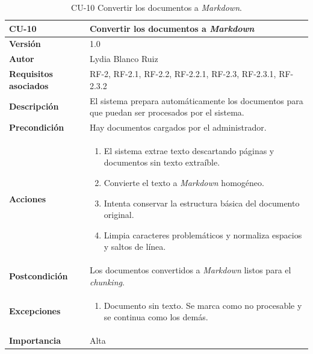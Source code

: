 \begin{table}[p]
	\centering
	\begin{tabularx}{\linewidth}{ p{} p{} }
		\toprule
		\textbf{CU-10}    & \textbf{Convertir los documentos a \textit{Markdown}}\\
		\toprule
		\textbf{Versión}              & 1.0    \\
		\textbf{Autor}                & Lydia Blanco Ruiz \\
		\textbf{Requisitos asociados} & RF-2, RF-2.1, RF-2.2, RF-2.2.1, RF-2.3, RF-2.3.1, RF-2.3.2 \\
		\textbf{Descripción}          & El sistema prepara automáticamente los documentos para que puedan ser procesados por el sistema. \\
		\textbf{Precondición}         & Hay documentos cargados por el administrador. \\
		\textbf{Acciones}             &
		\begin{enumerate}
			\def\labelenumi{\arabic{enumi}.}
			\tightlist
			\item El sistema extrae texto descartando páginas y documentos sin texto extraíble.
			\item Convierte el texto a \textit{Markdown} homogéneo.
			\item Intenta conservar la estructura básica del documento original.
			\item Limpia caracteres problemáticos y normaliza espacios y saltos de línea.
		\end{enumerate}\\
		\textbf{Postcondición}        & Los documentos convertidos a \textit{Markdown} listos para el \textit{chunking}. \\
		\textbf{Excepciones}          & 
		\begin{enumerate}
			\def\labelenumi{\arabic{enumi}.}
			\tightlist
			\item Documento sin texto. Se marca como no procesable y se continua como los demás.
		\end{enumerate}\\
		\textbf{Importancia}          & Alta  \\
		\bottomrule
	\end{tabularx}
	\caption{CU-10 Convertir los documentos a \textit{Markdown}.}
\end{table}

